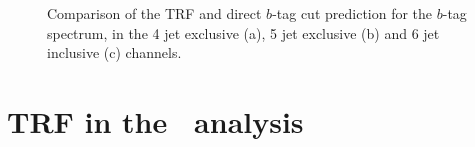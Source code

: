 \begin{figure}[h!tb]\begin{center}
	\caption{Comparison of the TRF and direct $b$-tag cut prediction for the $b$-tag spectrum, in the 4 jet exclusive (a), 5 jet exclusive (b) and 6 jet inclusive (c) channels.\label{fig:btags}}
\end{center}\end{figure}


\section{TRF in the \wbx\ analysis}

